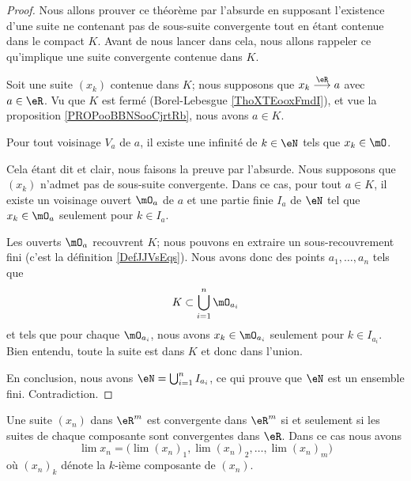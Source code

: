 \begin{proof}
    Nous allons prouver ce théorème par l'absurde en supposant l'existence d'une suite ne contenant pas de sous-suite convergente tout en étant contenue dans le compact \( K\). Avant de nous lancer dans cela, nous allons rappeler ce qu'implique une suite convergente contenue dans \( K\).

    Soit une suite \( (x_k)\) contenue dans \( K\); nous supposons que \( x_k\stackrel{\eR}{\longrightarrow} a\) avec \( a\in \eR\). Vu que \( K\) est fermé (Borel-Lebesgue \ref{ThoXTEooxFmdI}), et vue la proposition \ref{PROPooBBNSooCjrtRb}, nous avons \( a\in K\).

    Pour tout voisinage \( V_a\) de \( a\), il existe une infinité de \( k\in \eN\) tels que \( x_k\in\mO\).

    Cela étant dit et clair, nous faisons la preuve par l'absurde. Nous supposons que \( (x_k)\) n'admet pas de sous-suite convergente. Dans ce cas, pour tout \( a\in K\), il existe un voisinage ouvert \( \mO_a\) de \( a\) et une partie finie \( I_a\) de \( \eN\) tel que \( x_k\in \mO_a\) seulement pour \( k\in I_a\).

    Les ouverts \( \mO_a\) recouvrent \( K\); nous pouvons en extraire un sous-recouvrement fini (c'est la définition \ref{DefJJVsEqs}). Nous avons donc des points \( a_1,\ldots, a_n\) tels que 
    \begin{equation}
        K\subset \bigcup_{i=1}^n\mO_{a_i}
    \end{equation}
    et tels que pour chaque \( \mO_{a_i}\), nous avons \( x_k\in \mO_{a_i}\) seulement pour \( k\in I_{a_i}\). Bien entendu, toute la suite est dans \( K\) et donc dans l'union.

    En conclusion, nous avons \( \eN=\bigcup_{i=1}^n I_{a_i}\), ce qui prouve que \( \eN\) est un ensemble fini. Contradiction.
\end{proof}

\begin{proposition}		\label{PropCvRpComposante}
	Une suite $(x_n)$ dans $\eR^m$ est convergente dans $\eR^m$ si et seulement si les suites de chaque composante sont convergentes dans $\eR$. Dans ce cas nous avons
	 \begin{equation}
		 \lim x_n=\Big( \lim(x_n)_1,\lim (x_n)_2,\ldots,\lim (x_n)_m \Big)
	 \end{equation}
	 où $(x_n)_k$ dénote la $k$-ième composante de $(x_n)$.
\end{proposition}

